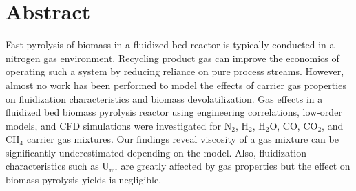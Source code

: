 
\section*{Abstract}

Fast pyrolysis of biomass in a fluidized bed reactor is typically conducted in a nitrogen gas environment. Recycling product gas can improve the economics of operating such a system by reducing reliance on pure process streams. However, almost no work has been performed to model the effects of carrier gas properties on fluidization characteristics and biomass devolatilization. Gas effects in a fluidized bed biomass pyrolysis reactor using engineering correlations, low-order models, and CFD simulations were investigated for N$_2$, H$_2$, H$_2$O, CO, CO$_2$, and CH$_4$ carrier gas mixtures. Our findings reveal viscosity of a gas mixture can be significantly underestimated depending on the model. Also, fluidization characteristics such as U$_\textrm{mf}$ are greatly affected by gas properties but the effect on biomass pyrolysis yields is negligible.
